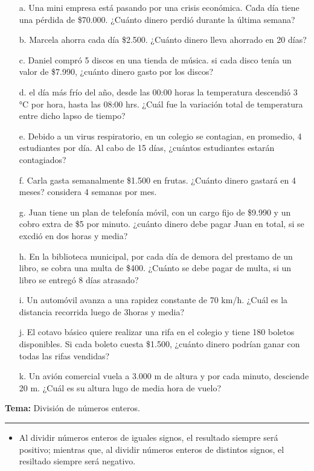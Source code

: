 \documentclass[spanish,letterpaper, 11pt, addpoints, answers]{exam}
\begin{document}
\begin{questions}
\begin{itemize}
  \item[a.] Una mini empresa está pasando por una crisis económica. Cada día tiene una pérdida de \$70.000. ¿Cuánto dinero perdió durante la última semana?
  \item[b.]Marcela ahorra cada día \$2.500. ¿Cuánto dinero lleva ahorrado en 20 días?
  \item[c.]Daniel compró 5 discos en una tienda de música. si cada disco tenía un valor de \$7.990, ¿cuánto dinero gasto por los discos?
  \item[d.]el día más frío del año, desde las 00:00 horas la temperatura descendió 3 °C por hora, hasta las 08:00 hrs. ¿Cuál fue la variación total de temperatura entre dicho lapso de tiempo? 
  \item[e.] Debido a un virus respiratorio, en un colegio se contagian, en promedio, 4 estudiantes por día. Al cabo de 15 días, ¿cuántos estudiantes estarán contagiados?
  \item[f.]Carla gasta semanalmente \$1.500 en frutas. ¿Cuánto dinero gastará en 4 meses? considera 4 semanas por mes.
  \item[g.] Juan tiene un plan de telefonía móvil, con un cargo fijo de \$9.990 y un cobro extra de \$5 por minuto. ¿cuánto dinero debe pagar Juan en total, si se excdió en dos horas y media?
  \item[h.] En la biblioteca municipal, por cada día de demora del prestamo de un libro, se cobra una multa de \$400. ¿Cuánto se debe pagar de multa, si un libro se entregó 8 días atrasado?
  \item[i.] Un automóvil avanza a una rapidez constante de 70 km/h. ¿Cuál es la distancia recorrida luego de 3horas y media?
  \item[j.]El cotavo básico quiere realizar una rifa en el colegio y tiene 180 boletos disponibles. Si cada boleto cuesta \$1.500, ¿cuánto dinero podrían ganar con todas las rifas vendidas? 
  \item[k.] Un avión comercial vuela a 3.000 m de altura y por cada minuto, desciende 20 m. ¿Cuál es su altura lugo de media hora de vuelo?
\end{itemize}

\newpage
  \vspace{0.1in}
  \parbox{6in}{
  \textbf{Tema:} División de números enteros.}
  \vspace{0.15in}
  \hrule 
  
  \begin{itemize}
    \item Al dividir números enteros de iguales signos, el resultado siempre será positivo; mientras que, al dividir números enteros de distintos signos, el resiltado siempre será negativo.
  

\end{itemize}
\end{questions}
\end{document}
